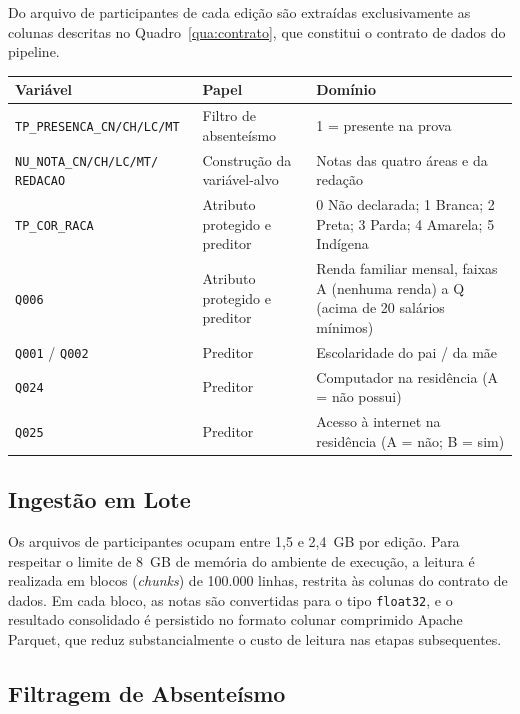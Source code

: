 Do arquivo de participantes de cada edição são extraídas exclusivamente as colunas descritas no Quadro~\ref{qua:contrato}, que constitui o contrato de dados do pipeline.

\begin{quadro}[htbp]
\centering
\caption{Contrato de dados: variáveis extraídas dos microdados do ENEM}
\label{qua:contrato}
\begin{tabular}{|p{4.6cm}|p{3.4cm}|p{6.5cm}|}
\hline
\textbf{Variável} & \textbf{Papel} & \textbf{Domínio} \\ \hline
\texttt{TP\_PRESENCA\_\allowbreak CN/CH/LC/MT} & Filtro de absenteísmo & 1 = presente na prova \\ \hline
\texttt{NU\_NOTA\_CN/CH/LC/MT/ REDACAO} & Construção da variável-alvo & Notas das quatro áreas e da redação \\ \hline
\texttt{TP\_COR\_RACA} & Atributo protegido e preditor & 0 Não declarada; 1 Branca; 2 Preta; 3 Parda; 4 Amarela; 5 Indígena \\ \hline
\texttt{Q006} & Atributo protegido e preditor & Renda familiar mensal, faixas A (nenhuma renda) a Q (acima de 20 salários mínimos) \\ \hline
\texttt{Q001} / \texttt{Q002} & Preditor & Escolaridade do pai / da mãe \\ \hline
\texttt{Q024} & Preditor & Computador na residência (A = não possui) \\ \hline
\texttt{Q025} & Preditor & Acesso à internet na residência (A = não; B = sim) \\ \hline
\end{tabular}
\end{quadro}

\subsection{Ingestão em Lote}

Os arquivos de participantes ocupam entre 1,5 e 2,4~GB por edição. Para respeitar o limite de 8~GB de memória do ambiente de execução, a leitura é realizada em blocos (\textit{chunks}) de 100.000 linhas, restrita às colunas do contrato de dados. Em cada bloco, as notas são convertidas para o tipo \texttt{float32}, e o resultado consolidado é persistido no formato colunar comprimido Apache Parquet, que reduz substancialmente o custo de leitura nas etapas subsequentes.

\subsection{Filtragem de Absenteísmo}

